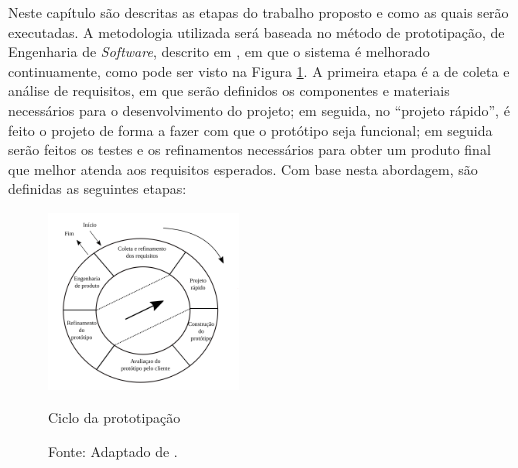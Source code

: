 
Neste capítulo são descritas as etapas do trabalho proposto e como as quais serão executadas. %
A metodologia utilizada será baseada no método de prototipação, de Engenharia de \textit{Software}, 
descrito em \cite{pressman}, em que o sistema é melhorado 
continuamente, como pode ser visto na Figura \ref{fig:prototipacao}. %
A primeira etapa é a de coleta e análise de requisitos, em que serão definidos os componentes e materiais necessários para o 
desenvolvimento do projeto; em seguida, no \textquotedblleft projeto rápido\textquotedblright, é feito o projeto de forma a 
fazer com que o protótipo seja funcional; em seguida serão feitos os testes e os refinamentos necessários para obter um produto final 
que melhor atenda aos requisitos esperados. 
Com base nesta abordagem, são definidas as seguintes etapas:

\begin{figure}[h]
 \centering
 \captionsetup{width=0.45\textwidth,font=footnotesize,textfont=bf}
 \includegraphics[width=0.45\textwidth,height=0.45\textheight,keepaspectratio]{figuras/prototipacao.png}
 \caption{Ciclo da prototipação \label{fig:prototipacao}}
 \vspace{-0.3cm}
 \caption*{Fonte: Adaptado de \cite[p.36]{pressman}.}
\end{figure}

